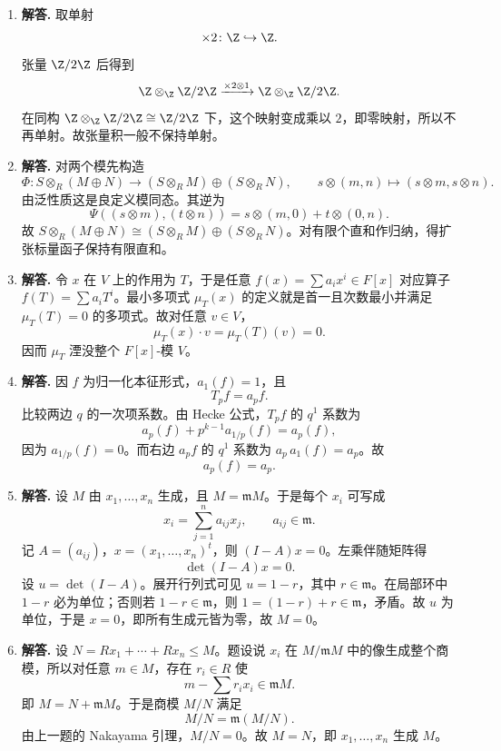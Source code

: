 \begin{enumerate}[label=\textbf{\arabic*.}, leftmargin=*, itemsep=1em]
  \item \textbf{解答.} 取单射
  \[
  \times 2\colon \Z\hookrightarrow \Z.
  \]
  张量 $\Z/2\Z$ 后得到
  \[
  \Z\otimes_\Z \Z/2\Z\xrightarrow{\times 2\otimes 1}\Z\otimes_\Z \Z/2\Z.
  \]
  在同构 $\Z\otimes_\Z \Z/2\Z\cong \Z/2\Z$ 下，这个映射变成乘以 $2$，即零映射，所以不再单射。故张量积一般不保持单射。

  \item \textbf{解答.} 对两个模先构造
  \[
  \Phi\colon S\otimes_R(M\oplus N)\to (S\otimes_R M)\oplus(S\otimes_R N),
  \qquad s\otimes(m,n)\mapsto (s\otimes m,s\otimes n).
  \]
  由泛性质这是良定义模同态。其逆为
  \[
  \Psi((s\otimes m),(t\otimes n))=s\otimes(m,0)+t\otimes(0,n).
  \]
  故 $S\otimes_R(M\oplus N)\cong (S\otimes_R M)\oplus(S\otimes_R N)$。对有限个直和作归纳，得扩张标量函子保持有限直和。

  \item \textbf{解答.} 令 $x$ 在 $V$ 上的作用为 $T$，于是任意 $f(x)=\sum a_ix^i\in F[x]$ 对应算子 $f(T)=\sum a_iT^i$。最小多项式 $\mu_T(x)$ 的定义就是首一且次数最小并满足 $\mu_T(T)=0$ 的多项式。故对任意 $v\in V$，
  \[
  \mu_T(x)\cdot v=\mu_T(T)(v)=0.
  \]
  因而 $\mu_T$ 湮没整个 $F[x]$-模 $V$。

  \item \textbf{解答.} 因 $f$ 为归一化本征形式，$a_1(f)=1$，且
  \[
  T_pf=a_pf.
  \]
  比较两边 $q$ 的一次项系数。由 Hecke 公式，$T_pf$ 的 $q^1$ 系数为
  \[
  a_p(f)+p^{k-1}a_{1/p}(f)=a_p(f),
  \]
  因为 $a_{1/p}(f)=0$。而右边 $a_pf$ 的 $q^1$ 系数为 $a_p\,a_1(f)=a_p$。故
  \[
  a_p(f)=a_p.
  \]

  \item \textbf{解答.} 设 $M$ 由 $x_1,\dots,x_n$ 生成，且 $M=\mathfrak mM$。于是每个 $x_i$ 可写成
  \[
  x_i=\sum_{j=1}^n a_{ij}x_j,\qquad a_{ij}\in\mathfrak m.
  \]
  记 $A=(a_{ij})$，$x=(x_1,\dots,x_n)^t$，则 $(I-A)x=0$。左乘伴随矩阵得
  \[
  \det(I-A)x=0.
  \]
  设 $u=\det(I-A)$。展开行列式可见 $u=1-r$，其中 $r\in\mathfrak m$。在局部环中 $1-r$ 必为单位；否则若 $1-r\in\mathfrak m$，则 $1=(1-r)+r\in\mathfrak m$，矛盾。故 $u$ 为单位，于是 $x=0$，即所有生成元皆为零，故 $M=0$。

  \item \textbf{解答.} 设 $N=Rx_1+\cdots+Rx_n\le M$。题设说 $x_i$ 在 $M/\mathfrak mM$ 中的像生成整个商模，所以对任意 $m\in M$，存在 $r_i\in R$ 使
  \[
  m-\sum r_ix_i\in \mathfrak mM.
  \]
  即 $M=N+\mathfrak mM$。于是商模 $M/N$ 满足
  \[
  M/N=\mathfrak m(M/N).
  \]
  由上一题的 Nakayama 引理，$M/N=0$。故 $M=N$，即 $x_1,\dots,x_n$ 生成 $M$。


\end{enumerate}
